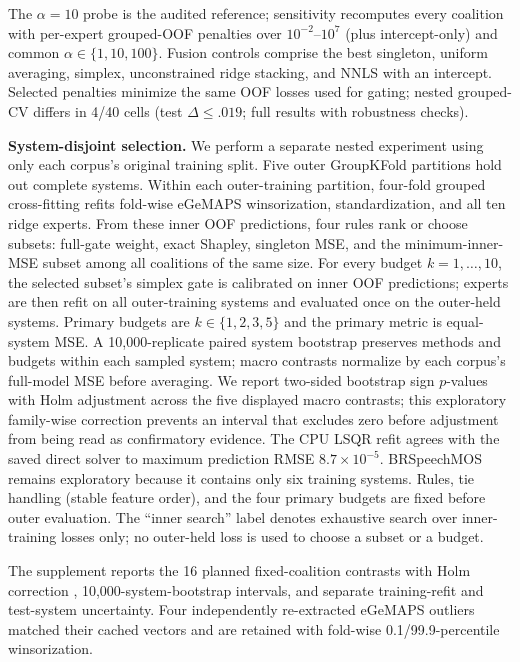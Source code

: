 \documentclass{article}
\begin{document}
The $\alpha=10$ probe is the audited reference; sensitivity recomputes every
coalition with per-expert grouped-OOF penalties over $10^{-2}$--$10^7$
(plus intercept-only) and common $\alpha\in\{1,10,100\}$.
Fusion controls comprise the best singleton, uniform averaging, simplex,
unconstrained ridge stacking, and NNLS with an intercept. Selected penalties
minimize the same OOF losses used for gating; nested grouped-CV differs in
4/40 cells (test $\Delta\leq.019$; full results with robustness checks).

\noindent\textbf{System-disjoint selection.} We perform a separate nested
experiment using only each corpus's original training split. Five outer
GroupKFold partitions hold out complete systems. Within each outer-training
partition, four-fold grouped cross-fitting refits fold-wise eGeMAPS
winsorization, standardization, and all ten ridge experts. From these inner OOF
predictions, four rules rank or choose subsets: full-gate weight, exact Shapley,
singleton MSE, and the minimum-inner-MSE subset among all coalitions of the same
size. For every budget $k=1,\ldots,10$, the selected subset's simplex gate is
calibrated on inner OOF predictions; experts are then refit on all outer-training
systems and evaluated once on the outer-held systems. Primary budgets are
$k\in\{1,2,3,5\}$ and the primary metric is equal-system MSE. A 10,000-replicate
paired system bootstrap preserves methods and budgets within each sampled
system; macro contrasts normalize by each corpus's full-model MSE before
averaging. We report two-sided bootstrap sign $p$-values with Holm adjustment
across the five displayed macro contrasts; this exploratory family-wise
correction prevents an interval that excludes zero before adjustment from
being read as confirmatory evidence. The CPU LSQR refit agrees with the saved direct solver to maximum
prediction RMSE $8.7\!\times\!10^{-5}$. BRSpeechMOS remains exploratory because
it contains only six training systems. Rules, tie handling (stable feature
order), and the four primary budgets are fixed before outer evaluation. The
``inner search'' label denotes exhaustive search over inner-training losses
only; no outer-held loss is used to choose a subset or a budget.

The supplement reports the 16 planned fixed-coalition contrasts with Holm
correction \cite{holm1979procedure}, 10,000-system-bootstrap intervals, and
separate training-refit and test-system uncertainty. Four independently
re-extracted eGeMAPS outliers matched their cached vectors and are retained
with fold-wise 0.1/99.9-percentile winsorization.
\end{document}
